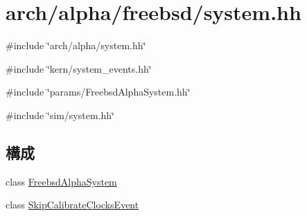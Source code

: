 \hypertarget{arch_2alpha_2freebsd_2system_8hh}{
\section{arch/alpha/freebsd/system.hh}
\label{arch_2alpha_2freebsd_2system_8hh}
}
{\ttfamily \#include \char`\"{}arch/alpha/system.hh\char`\"{}}\par
{\ttfamily \#include \char`\"{}kern/system\_\-events.hh\char`\"{}}\par
{\ttfamily \#include \char`\"{}params/FreebsdAlphaSystem.hh\char`\"{}}\par
{\ttfamily \#include \char`\"{}sim/system.hh\char`\"{}}\par
\subsection*{構成}
\begin{DoxyCompactItemize}
\item 
class \hyperlink{classFreebsdAlphaSystem}{FreebsdAlphaSystem}
\item 
class \hyperlink{classFreebsdAlphaSystem_1_1SkipCalibrateClocksEvent}{SkipCalibrateClocksEvent}
\end{DoxyCompactItemize}

